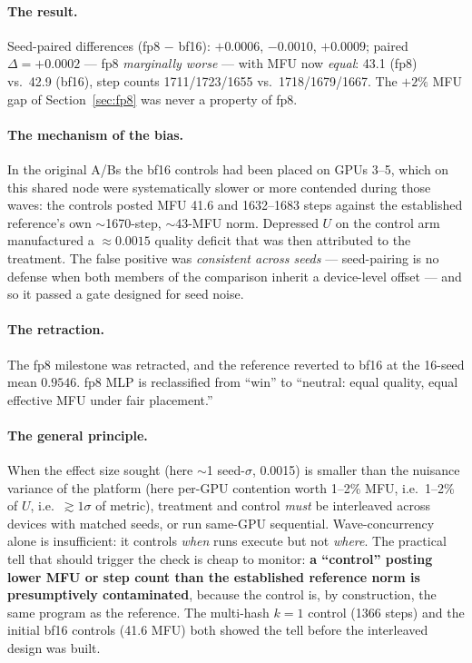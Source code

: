 \documentclass{article}
\begin{document}
\paragraph{The result.} Seed-paired differences (fp8 $-$ bf16): $+0.0006$, $-0.0010$, $+0.0009$; paired $\Delta = +0.0002$ --- fp8 \emph{marginally worse} --- with MFU now \emph{equal}: 43.1 (fp8) vs.\ 42.9 (bf16), step counts 1711/1723/1655 vs.\ 1718/1679/1667. The $+2\%$ MFU gap of Section~\ref{sec:fp8} was never a property of fp8.

\paragraph{The mechanism of the bias.} In the original A/Bs the bf16 controls had been placed on GPUs 3--5, which on this shared node were systematically slower or more contended during those waves: the controls posted MFU 41.6 and 1632--1683 steps against the established reference's own $\sim$1670-step, $\sim$43-MFU norm. Depressed $U$ on the control arm manufactured a $\approx 0.0015$ quality deficit that was then attributed to the treatment. The false positive was \emph{consistent across seeds} --- seed-pairing is no defense when both members of the comparison inherit a device-level offset --- and so it passed a gate designed for seed noise.

\paragraph{The retraction.} The fp8 milestone was retracted, and the reference reverted to bf16 at the 16-seed mean $0.9546$. fp8 MLP is reclassified from ``win'' to ``neutral: equal quality, equal effective MFU under fair placement.''

\paragraph{The general principle.} When the effect size sought (here $\sim$1 seed-$\sigma$, 0.0015) is smaller than the nuisance variance of the platform (here per-GPU contention worth 1--2\% MFU, i.e.\ 1--2\% of $U$, i.e.\ $\gtrsim 1\sigma$ of metric), treatment and control \emph{must} be interleaved across devices with matched seeds, or run same-GPU sequential. Wave-concurrency alone is insufficient: it controls \emph{when} runs execute but not \emph{where}. The practical tell that should trigger the check is cheap to monitor: \textbf{a ``control'' posting lower MFU or step count than the established reference norm is presumptively contaminated}, because the control is, by construction, the same program as the reference. The multi-hash $k{=}1$ control (1366 steps) and the initial bf16 controls (41.6 MFU) both showed the tell before the interleaved design was built.
\end{document}
